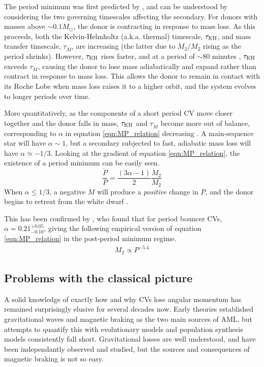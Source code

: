 The period minimum was first predicted by \citet{rappaport1982}, and can be understood by considering the two governing timescales affecting the secondary.
For donors with masses above $\sim0.1 M_{\odot}$, the donor is contracting in response to mass loss.
As this proceeds, both the Kelvin-Helmholtz (a.k.a. thermal) timescale, $\tau_{\rm KH}$, and mass transfer timescale, $\tau_{\dot M}$, are increasing (the latter due to $\dot M_2 / M_2$ rising as the period shrinks). However, $\tau_{\rm KH}$ rises faster, and at a period of $\sim80$ minutes \citep{ritter1998, McAllister2019}, $\tau_{\rm KH}$ exceeds $\tau_{\dot M}$, causing the donor to lose mass adiabatically and expand rather than contract in response to mass loss.
This allows the donor to remain in contact with its Roche Lobe when mass loss raises it to a higher orbit, and the system evolves to longer periods over time.

More quantitatively, as the components of a short period CV move closer together and the donor falls in mass, $\tau_{\rm KH}$ and $\tau_{\dot M}$ become more out of balance, corresponding to $\alpha$ in equation \ref{eqn:MP_relation} decreasing \citep{Knigge2011b}. A main-sequence star will have $\alpha \sim 1$, but a secondary subjected to fast, adiabatic mass loss will have $\alpha \simeq -1/3$. Looking at the gradient of equation \ref{eqn:MP_relation}, the existence of a period minimum can be easily seen.
\begin{equation}
    \frac{\dot P}{P} = \frac{(3\alpha - 1)}{2} \frac{\dot M_2}{M_2}
\end{equation}
When $\alpha \le 1/3$, a negative $\dot M$ will produce a \textit{positive} change in $P$, and the donor begins to retreat from the white dwarf \citep{rezzolla2001}.

This has been confirmed by \citet{knigge11}, who found that for period bouncer CVs, $\alpha = 0.21^{+0.05}_{-0.10}$, giving the following empirical version of equation \ref{eqn:MP_relation} in the post-period minimum regime.
\begin{align}
    M_2 \propto P^{-5.4}
\end{align}


\subsection{Problems with the classical picture}
\label{sect:introduction:modern AML}

A solid knowledge of exactly how and why CVs lose angular momentum has remained surprisingly elusive for several decades now. Early theories established gravitational waves and magnetic braking as the two main sources of AML, but attempts to quantify this with evolutionary models and population synthesis models consistently fall short. Gravitational losses are well understood, and have been independantly observed and studied, but the sources and consequences of magnetic braking is not so easy.

